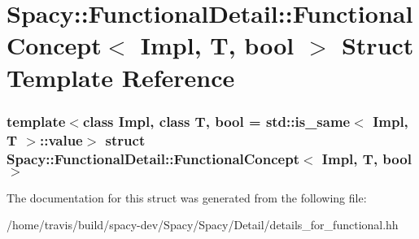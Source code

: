 \hypertarget{structSpacy_1_1FunctionalDetail_1_1FunctionalConcept}{\section{\-Spacy\-:\-:\-Functional\-Detail\-:\-:\-Functional\-Concept$<$ \-Impl, \-T, bool $>$ \-Struct \-Template \-Reference}
\label{structSpacy_1_1FunctionalDetail_1_1FunctionalConcept}
}
\subsubsection*{template$<$class Impl, class T, bool = std\-::is\-\_\-same$<$ Impl, T $>$\-::value$>$ struct Spacy\-::\-Functional\-Detail\-::\-Functional\-Concept$<$ Impl, T, bool $>$}



\-The documentation for this struct was generated from the following file\-:\begin{DoxyCompactItemize}
\item 
/home/travis/build/spacy-\/dev/\-Spacy/\-Spacy/\-Detail/details\-\_\-for\-\_\-functional.\-hh\end{DoxyCompactItemize}

